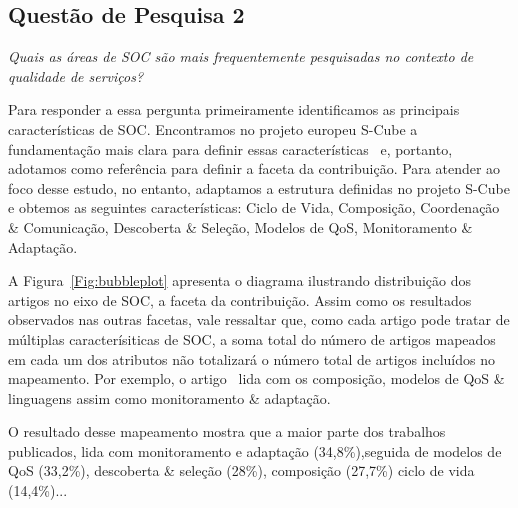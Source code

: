 \subsection{Quest\~{a}o de Pesquisa 2}
\emph{Quais as áreas de SOC são mais frequentemente pesquisadas no contexto de qualidade de serviços?}


Para responder a essa pergunta primeiramente identificamos as principais caracter\'{i}sticas de SOC. Encontramos no projeto europeu S-Cube a 
fundamenta\c c\~{a}o mais clara para definir essas caracter\'{i}sticas~\cite{SCube-FINALREPORT} e, portanto, adotamos como refer\^{e}ncia para definir a faceta da contribui\c{c}\~{a}o. Para atender ao foco desse estudo, no entanto, adaptamos a estrutura definidas no projeto S-Cube e obtemos as seguintes caracter\'{i}sticas: Ciclo de Vida, Composi\c{c}\~{a}o, Coordena\c{c}\~{a}o \& Comunica\c c\~{a}o, Descoberta \& Sele\c{c}\~{a}o, Modelos de QoS, Monitoramento \& Adapta\c{c}\~{a}o. 

A Figura~\ref{Fig:bubbleplot} apresenta o diagrama ilustrando distribui\c{c}\~{a}o dos artigos no eixo de SOC, a faceta da contribui\c{c}\~{a}o. Assim como os resultados observados nas outras facetas, vale ressaltar que, como cada artigo pode tratar de m\'{u}ltiplas caracter\'{i}siticas de SOC, a soma total do n\'{u}mero de artigos mapeados em cada um dos atributos n\~{a}o totalizar\'{a} o n\'{u}mero total de artigos inclu\'{i}dos no mapeamento. Por exemplo, o artigo~\cite{A QoS-aware fault tolerant middleware for dependable service composition} lida com os composi\c{c}\~{a}o, modelos de QoS \& linguagens assim como monitoramento \& adapta\c{c}\~{a}o. 

O resultado desse mapeamento mostra que a maior parte dos trabalhos publicados, lida com monitoramento e adapta\c{c}\~{a}o (34,8\%),seguida de modelos de QoS (33,2\%), descoberta \& sele\c{c}\~{a}o (28\%),  composi\c c\~{a}o (27,7\%) ciclo de vida (14,4\%)...

